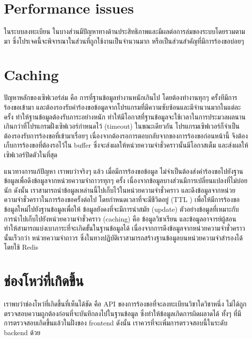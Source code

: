 \section{Performance issues}
ในระบบลงทะเบียน ในบางส่วนมีปัญหาทางด้านประสิทธิภาพและมีผลต่อการล่มของระบบโดยรวมตามมา ซี่งโปรเจคนี้จะพิจารณาในส่วนที่ถูกใช้งานเป็นจำนวนมาก หรือเป็นส่วนสำคัญที่มีการร้องขอบ่อยๆ

\section{Caching}

ปัญหาหลักของเซิฟเวอร์ล่ม คือ การที่ฐานข้อมูลทำงานหนักเกินไป โดยต้องทำงานทุกๆ ครั้งทีมีการร้องขอเข้ามา และต้องรองรับคำร้องขอข้อมูลจากโปรแกรมที่มีความซับซ้อนและมีจำนวนมากในแต่ละครั้ง ทำให้ฐานข้อมูลต้องรับภาระอย่างหนัก 
ทำให้มีโอกาสที่ฐานข้อมูลจะใช้เวลาในการประมวลผลนานเกินกว่าที่โปรแกรมฝั่งเซิฟเวอร์กำหนดไว้ (timeout) ในขณะเดียวกัน โปรแกรมเซิฟเวอร์ก็จำเป็นต้องรองรับการร้องขอที่เข้ามาเรื่อยๆ เนื่องจากต้องรอการตอบกลับจากของการร้องขอก่อนหน้านี้ จึงต้องเก็บการร้องขอที่ต้องรอไว้ใน buffer ซึ่งจะส่งผลให้หน่วยความจำชั่วคราวนั้นมีโอกาสเต็ม และส่งผลให้เซิฟเวอร์ปิดตัวในที่สุด

แนวทางการแก้ปัญหา เราพบว่าจริงๆ แล้ว เมื่อมีการร้องขอข้อมูล ไม่จำเป็นต้องส่งคำร้องขอไปยังฐานข้อมูลเพื่อดึงข้อมูลจากหน่วยความจำถาวรทุกๆ ครั้ง เนื่องจากข้อมูลบางส่วนมีการเปลี่ยนแปลงที่ไม่บ่อยนัก ดังนั้น เราสามารถนำข้อมูลเหล่านนี้ไปเก็บไว้ในหน่วยความจำชั่วคราว และดึงข้อมูลจากหน่วยความจำชั่วคราวในการร้องขอครั้งต่อไป โดยกำหนดเวลาที่จะมีชีวิตอยู่ (TTL \cite{ttl}) เพื่อให้มีการร้องขอข้อมูลใหม่ไปยังฐานข้อมูลเพื่อให้ ข้อมูลยังคงที่จะมีการนำสมัย (update) ตัวอย่างข้อมูลที่เหมาะกับการนำไปเก็บไปยังหน่วยความจำชั่วคราว (caching) คือ ข้อมูลวิชาเรียน และข้อมูลอาจารย์ผู้สอน ทำให้สามารถแบ่งเบาภาระที่จะเกิดขั้นในฐานข้อมูลได้ เนื่องจากการดึงข้อมูลจากหน่วยความจำชั่วคราวนั้นเร็วกว่า หน่วยความจำถาวร ซึ่งในทางปฏิบัติเราสามารถสร้างฐานข้อมูลบนหน่วยความจำสำรองได้โดยใช้ Redis \cite{redis}

\section{ช่องโหว่ที่เกิดขึ้น}

เราพบว่าช่องโหว่ที่เกิดขึ้นที่เห็นได้ชัด คือ API ของการร้องขอที่จะลงทะเบียนวิชาใดวิชาหนึ่ง ไม่ได้ถูกตรวจสอบความถูกต้องก่อนที่จะบันทึกลงไปในฐานข้อมูล ซึ่งทำให้ข้อมูลเกิดการผิดผลาดได้ ทั้งๆ ที่มีการตรวจสอบเกิดขึ้นแล้วในฝั่งของ frontend
ดังนั้น เราควรที่จะเพิ่มการตรวจสอบนี้ในระดับ backend ด้วย
